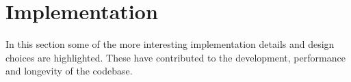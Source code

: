 \chapter{Implementation}

In this section some of the more interesting implementation details and design choices are highlighted. These have contributed to the development, performance and longevity of the codebase.





